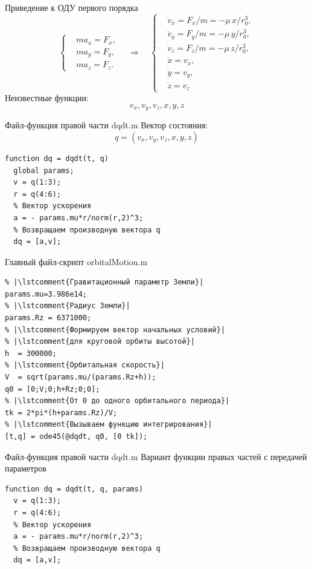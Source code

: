 \documentclass[11pt, compress]{beamer}
\newcommand{\lstcomment}[1]{\textcolor{dark-green}{\texttt{#1}}}
\begin{document}
\begin{frame}[fragile]{Приведение к ОДУ первого порядка}
$$
\left\{
\begin{aligned}
  & m a_x = F_x, \\
  & m a_y = F_y, \\
  & m a_z = F_z.
\end{aligned}\right. \quad \Rightarrow \quad
\left\{
\begin{aligned}
  & \dot v_x = F_x/m = - \mu \, x / r_0^3, \\
  & \dot v_y = F_y/m = - \mu \, y / r_0^3, \\
  & \dot v_z = F_z/m = - \mu \, z / r_0^3, \\
  & \dot x = v_x, \\
  & \dot y = v_y, \\
  & \dot z = v_z 
\end{aligned}
\right.
$$
Неизвестные функции: 
$$
  v_x, v_y, v_z, x, y, z
$$
\end{frame}

\begin{frame}[fragile]{Файл-функция правой части dqdt.m}
Вектор состояния:
$$
  q = (v_x, v_y, v_z, x, y, z)
$$
\begin{lstlisting}
function dq = dqdt(t, q) 
  global params;
  v = q(1:3);
  r = q(4:6);  
  % Вектор ускорения
  a = - params.mu*r/norm(r,2)^3;
  % Возвращаем производную вектора q
  dq = [a,v];
\end{lstlisting}
\end{frame}

\begin{frame}[fragile]{Главный файл-скрипт orbitalMotion.m}
\begin{lstlisting}
% |\lstcomment{Гравитационный параметр Земли}|
params.mu=3.986e14;
% |\lstcomment{Радиус Земли}|
params.Rz = 6371000;    
% |\lstcomment{Формируем вектор начальных условий}|
% |\lstcomment{для круговой орбиты высотой}|
h  = 300000;
% |\lstcomment{Орбитальная скорость}|
V  = sqrt(params.mu/(params.Rz+h));  
q0 = [0;V;0;h+Rz;0;0];
% |\lstcomment{От 0 до одного орбитального периода}|
tk = 2*pi*(h+params.Rz)/V;
% |\lstcomment{Вызываем функцию интегрирования}|
[t,q] = ode45(@dqdt, q0, [0 tk]);  
\end{lstlisting}
\end{frame}



\begin{frame}[fragile]{Файл-функция правой части dqdt.m}
Вариант функции правых частей с передачей параметров
\begin{lstlisting}
function dq = dqdt(t, q, params)   
  v = q(1:3);
  r = q(4:6);  
  % Вектор ускорения
  a = - params.mu*r/norm(r,2)^3;
  % Возвращаем производную вектора q
  dq = [a,v];
\end{lstlisting}
\end{frame}
\end{document}
